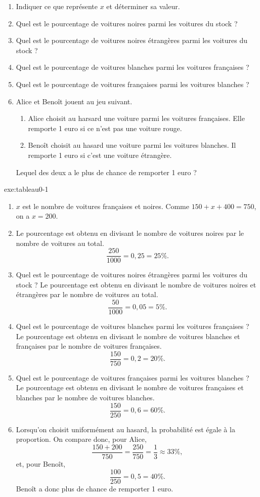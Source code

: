 {	\begin{enumerate}
		\item Indiquer ce que représente $x$ et déterminer sa valeur.
		\item Quel est le pourcentage de voitures noires parmi les voitures du stock ?
		\item Quel est le pourcentage de voitures noires étrangères parmi les voitures du stock ?
		\item Quel est le pourcentage de voitures blanches parmi les voitures françaises ?
		\item Quel est le pourcentage de voitures françaises parmi les voitures blanches ?
		\item Alice et Benoît jouent au jeu suivant.
			\begin{enumerate}[label=--]
				\item Alice choisit au harsard une voiture parmi les voitures françaises.
				Elle remporte 1 euro si ce n'est pas une voiture rouge.
				\item Benoît choisit au hasard une voiture parmi les voitures blanches.
				Il remporte 1 euro si c'est une voiture étrangère.
			\end{enumerate}
		Lequel des deux a le plus de chance de remporter 1 euro ?
	\end{enumerate}
}{exe:tableau0-1}{
	\begin{enumerate}
		\item
		$x$ est le nombre de voitures françaises et noires. 
		Comme $150+x+400 = 750$, on a $x = 200$.
		\item 
		Le pourcentage est obtenu en divisant le nombre de voitures noires par le nombre de voitures au total.
			\[ \dfrac{250}{1000} = 0,25 = 25\%. \]
		\item Quel est le pourcentage de voitures noires étrangères parmi les voitures du stock ?
		Le pourcentage est obtenu en divisant le nombre de voitures noires et étrangères par le nombre de voitures au total.
			\[ \dfrac{50}{1000} = 0,05 = 5\%. \]
		\item Quel est le pourcentage de voitures blanches parmi les voitures françaises ?
		Le pourcentage est obtenu en divisant le nombre de voitures blanches et françaises par le nombre de voitures françaises.
			\[ \dfrac{150}{750} = 0,2 = 20\%. \]
		\item Quel est le pourcentage de voitures françaises parmi les voitures blanches ?
		Le pourcentage est obtenu en divisant le nombre de voitures françaises et blanches par le nombre de voitures blanches.
			\[ \dfrac{150}{250} = 0,6 = 60\%. \]
		\item
		Lorsqu'on choisit uniformément au hasard, la probabilité est égale à la proportion.
		On compare donc, pour Alice,
			\[ \dfrac{150+200}{750} = \dfrac{250}{750} = \dfrac13 \approx 33\%, \]
		et, pour Benoît,
			\[ \dfrac{100}{250} = 0,5 = 40\%. \]
		Benoît a donc plus de chance de remporter 1 euro.
	\end{enumerate}
}


